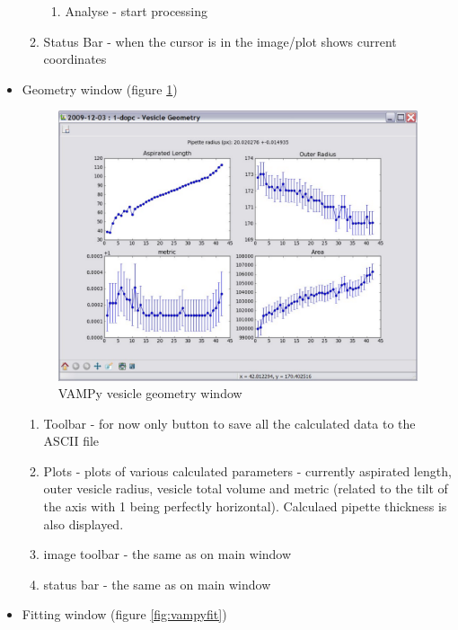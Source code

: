 \begin{itemize}
\begin{enumerate}
\begin{enumerate}
						\item Analyse - start processing 
					\end{enumerate}
				\item Status Bar - when the cursor is in the image/plot shows current coordinates 
		\end{enumerate}
	\item Geometry window (figure \ref{fig:vampygeom})
		\begin{figure}[htbp]
			\centering
			\includegraphics[width=1.00\textwidth]{figs/vampygeom.pdf}
			\caption{VAMPy vesicle geometry window}
			\label{fig:vampygeom}
		\end{figure}
		\begin{enumerate}
			\item Toolbar - for now only button to save all the calculated data to the ASCII file
			\item Plots - plots of various calculated parameters - currently aspirated length, outer vesicle radius, vesicle total volume and metric (related to the tilt of the axis with 1 being perfectly horizontal). Calculaed pipette thickness is also displayed.
			\item image toolbar - the same as on main window
			\item status bar - the same as on main window
		\end{enumerate}
	\item Fitting window (figure \ref{fig:vampyfit})
		\begin{figure}[htbp]
			\centering

\end{figure}
\end{itemize}
